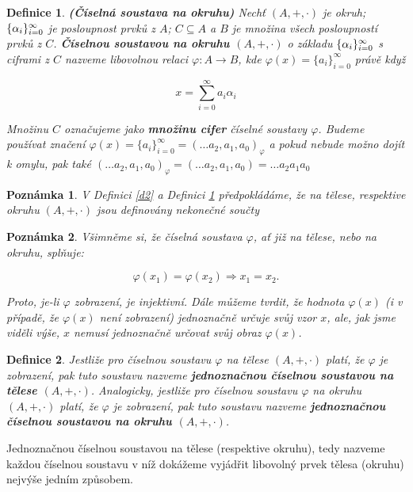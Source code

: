 \documentclass[12pt]{book}
\newtheorem{definice}{Definice}
\newtheorem{pozn}{Poznámka}
\begin{document}
\begin{definice}\label{d3} \textbf{(Číselná soustava na okruhu)}
	Nechť $(A,+,\cdot)$ je okruh; $\{\alpha_i\}_{i=0}^{\infty}$ je posloupnost prvků z $A$; $C\subseteq A$ a $B$ je množina všech posloupností prvků z $C$.
	\textbf{Číselnou soustavou na okruhu $(A,+,\cdot)$} o základu $\{\alpha_i\}_{i=0}^{\infty}$ s ciframi z $C$ nazveme libovolnou relaci $\varphi : A \rightarrow B$, kde 	$\varphi(x)= \{a_{i}\}_{i=0}^{\infty}$ právě když
	
	$$x = \sum_{i=0}^{\infty} a_{i}\alpha_{i}$$
	
	Množinu $C$ označujeme jako \textbf{množinu cifer} číselné soustavy $\varphi$. Budeme používat značení $\varphi(x) = \{a_{i}\}_{i=0}^{\infty} = (\dots a_2,a_1,a_0)_{\varphi}$ a pokud nebude možno dojít k omylu, pak také $(\dots a_2,a_1,a_0)_{\varphi} = (\dots a_2,a_1,a_0) = \dots a_2a_1a_0$
\end{definice}

\begin{pozn}
	V Definici \ref{d2} a Definici \ref{d3} předpokládáme, že na tělese, respektive okruhu $(A,+,\cdot)$ jsou definovány nekonečné součty
\end{pozn}

\begin{pozn}
	Všimněme si, že číselná soustava $\varphi$, ať již na tělese, nebo na okruhu, splňuje:
	
	$$\varphi (x_1) = \varphi(x_2) \Rightarrow x_1 = x_2.$$
	
	Proto, je-li $\varphi$ zobrazení, je injektivní.
	Dále můžeme tvrdit, že hodnota $\varphi(x)$ (i v případě, že $\varphi(x)$ není zobrazení) jednoznačně určuje svůj vzor $x$, ale, jak jsme viděli výše, $x$ nemusí jednoznačně určovat svůj obraz $\varphi(x)$.
	
\end{pozn}

\begin{definice}
	Jestliže pro číselnou soustavu $\varphi$ na tělese $(A,+,\cdot)$ platí, že $\varphi$ je zobrazení, pak tuto soustavu nazveme \textbf{jednoznačnou číselnou soustavou na tělese $(A,+,\cdot)$}. Analogicky, jestliže pro číselnou soustavu $\varphi$ na okruhu $(A,+,\cdot)$ platí, že $\varphi$ je zobrazení, pak tuto soustavu nazveme \textbf{jednoznačnou číselnou soustavou na okruhu $(A,+,\cdot)$}.
\end{definice}

Jednoznačnou číselnou soustavou na tělese (respektive okruhu), tedy nazveme každou číselnou soustavu v níž dokážeme vyjádřit libovolný prvek tělesa (okruhu) nejvýše jedním způsobem.
\end{document}
